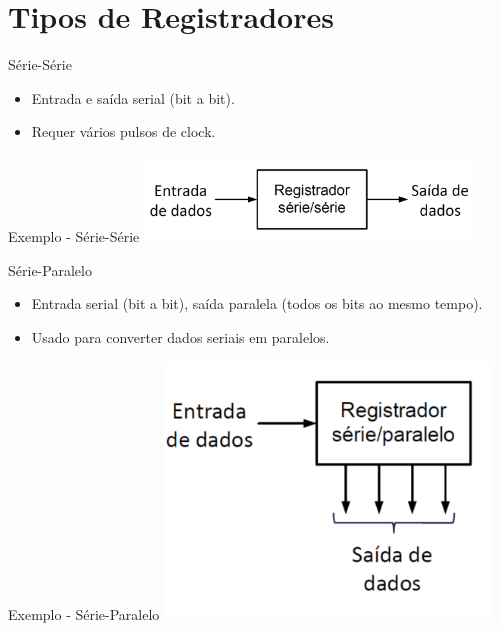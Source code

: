 \documentclass{beamer}
\begin{document}
\section{Tipos de Registradores}

\begin{frame}{Série-Série}
\begin{itemize}
    \item Entrada e saída serial (bit a bit).
    \item Requer vários pulsos de clock.
\end{itemize}
\end{frame}

\begin{frame}{Exemplo - Série-Série}
\centering
\includegraphics[width=0.65\textwidth]{figures/serie_serie.png}
\end{frame}

\begin{frame}{Série-Paralelo}
\begin{itemize}
    \item Entrada serial (bit a bit), saída paralela (todos os bits ao mesmo tempo).
    \item Usado para converter dados seriais em paralelos.
\end{itemize}
\end{frame}

\begin{frame}{Exemplo - Série-Paralelo}
\centering
\includegraphics[width=0.65\textwidth]{figures/serie_paralelo.png}
\end{frame}
\end{document}
